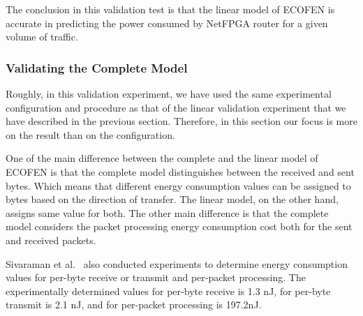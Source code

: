 The conclusion in this validation test is that the linear model of ECOFEN is accurate in predicting the power consumed by NetFPGA router for a given volume of traffic. 

\subsubsection{Validating the Complete Model}
Roughly, in this validation experiment, we have used the same experimental configuration and procedure as that of the linear validation experiment that we have described in the previous section. Therefore, in this section our focus is more on the result than on the configuration.

One of the main difference between the complete and the linear model of ECOFEN is that the complete model distinguishes between the received and sent bytes. Which means that different energy consumption values can be assigned to bytes based on the direction of transfer. The linear model, on the other hand, assigns same value for both. The other main difference is that the complete model considers the packet processing energy consumption cost both for the sent and received packets. 

Sivaraman et al.{\ }\cite{Sivaraman} also conducted experiments to determine energy consumption values for per-byte receive or transmit and per-packet processing. The experimentally determined values for per-byte receive is 1.3 nJ, for per-byte transmit is 2.1 nJ, and for per-packet processing is 197.2nJ. 

